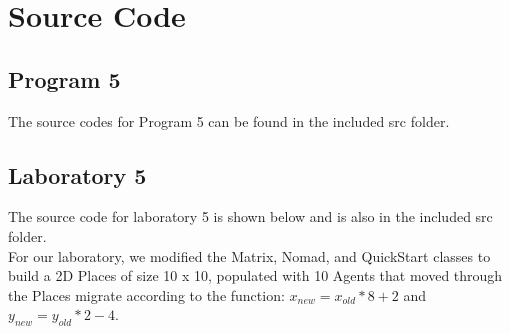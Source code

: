 \documentclass{article}
\begin{document}
\pagebreak
	
	\section{Source Code} \label{SRC}
		\subsection{Program 5} \label{P5_SRC}
		The source codes for Program 5 can be found in the included src folder.\\
	
	
		\subsection{Laboratory 5} \label{L5_SRC}
			The source code for laboratory 5 is shown below and is also in the included src folder.\\
			For our laboratory, we modified the Matrix, Nomad, and QuickStart classes to build a 2D Places of size 10 x 10, populated with 10 Agents that moved through the Places migrate according to the function: $x_{new} = x_{old} * 8 + 2$ and $y_{new} = y_{old} * 2 - 4$.
\end{document}
